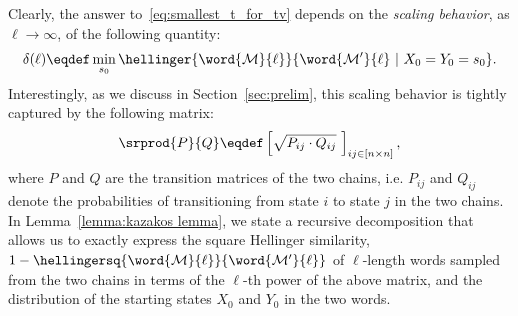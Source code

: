 \medskip Clearly, the answer to~\eqref{eq:smallest_t_for_tv} depends on the 
%
{\em scaling behavior}, as $\ell \rightarrow \infty$, of the following quantity:
\begin{align}
\delta(\ell)\eqdef\min_{s_0} \hellinger{\word{\cal M}{\ell}}{\word{\cal M'}{\ell}~|~X_0=Y_0=s_0}. \label{eq:worst word tv}
\end{align}
Interestingly, as we discuss in Section~\ref{sec:prelim}, this scaling behavior is tightly captured by 
the following matrix:
$$\srprod{P}{Q}\eqdef\left[\sqrt{P_{ij}\cdot Q_{ij}}~ \right]_{ij\in[n\times n]},$$
where $P$ and $Q$ are the transition matrices of the two chains, i.e. $P_{ij}$ and $Q_{ij}$ denote the probabilities of transitioning from state $i$ to state $j$ in the two chains. In 
Lemma~\ref{lemma:kazakos lemma}, we state a recursive decomposition that allows us to exactly express the square Hellinger similarity, 
$1-\hellingersq{\word{\cal M}{\ell}}{\word{\cal M'}{\ell}}$ of $\ell$-length words sampled from the two chains in terms of the $\ell$-th power of the above matrix, and the distribution of the 
starting states $X_0$ and $Y_0$ in the two words. 

